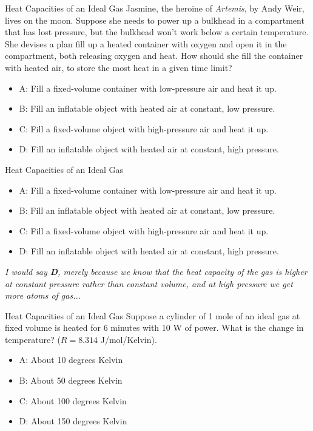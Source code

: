 \documentclass{beamer}
\begin{document}
\begin{frame}{Heat Capacities of an Ideal Gas}
\small
Jasmine, the heroine of \textit{Artemis}, by Andy Weir, lives on the moon.  Suppose she needs to power up a bulkhead in a compartment that has lost pressure, but the bulkhead won't work below a certain temperature.  She devises a plan fill up a heated container with oxygen and open it in the compartment, both releasing oxygen and heat.  How should she fill the container with heated air, to store the most heat in a given time limit?
\begin{itemize}
\item A: Fill a fixed-volume container with low-pressure air and heat it up.
\item B: Fill an inflatable object with heated air at constant, low pressure.
\item C: Fill a fixed-volume object with high-pressure air and heat it up.
\item D: Fill an inflatable object with heated air at constant, high pressure.
\end{itemize}
\end{frame}

\begin{frame}{Heat Capacities of an Ideal Gas}
\small
\begin{itemize}
\item A: Fill a fixed-volume container with low-pressure air and heat it up.
\item B: Fill an inflatable object with heated air at constant, low pressure.
\item C: Fill a fixed-volume object with high-pressure air and heat it up.
\item D: Fill an inflatable object with heated air at constant, high pressure.
\end{itemize}
\textit{I would say \textbf{D}, merely because we know that the heat capacity of the gas is higher at constant pressure rather than constant volume, and at high pressure we get more atoms of gas...}
\end{frame}

\begin{frame}{Heat Capacities of an Ideal Gas}
Suppose a cylinder of 1 mole of an ideal gas at fixed volume is heated for 6 minutes with 10 W of power.  What is the change in temperature?  ($R = 8.314$ J/mol/Kelvin).
\begin{itemize}
\item A: About 10 degrees Kelvin
\item B: About 50 degrees Kelvin
\item C: About 100 degrees Kelvin
\item D: About 150 degrees Kelvin
\end{itemize}
\end{frame}
\end{document}
